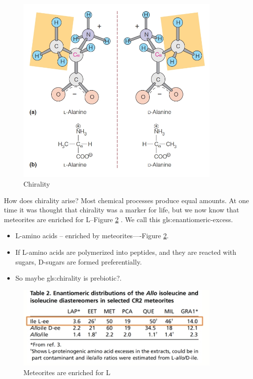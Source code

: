\documentclass[]{article}
\begin{document}
\begin{figure}[H]
	\caption{Chirality} \label{fig:Chirality1} 
	\includegraphics[width=0.9\textwidth]{Chirality1}
\end{figure}

How does chirality arise? Most chemical processes produce equal amounts. At one time it was thought that chirality was a marker for life, but we now know that meteorites are enriched for L--Figure \ref{fig:Chirality2}  \cite{pizzarello2012large}. We call this \gls{gls:enantiomeric-excess}.

\begin{itemize}
	\item L-amino acids – enriched by meteorites----Figure \ref{fig:Chirality2}.
	\item If L-amino acids are polymerized into peptides, and they are reacted with sugars, D-sugars are formed preferentially.
	\item So maybe \gls{gls:chirality} is prebiotic?.
\end{itemize}

\begin{figure}[H]
	\caption{Meteorites are enriched for L} \label{fig:Chirality2} 
	\includegraphics[width=0.9\textwidth]{Chirality2}
\end{figure}
\end{document}
